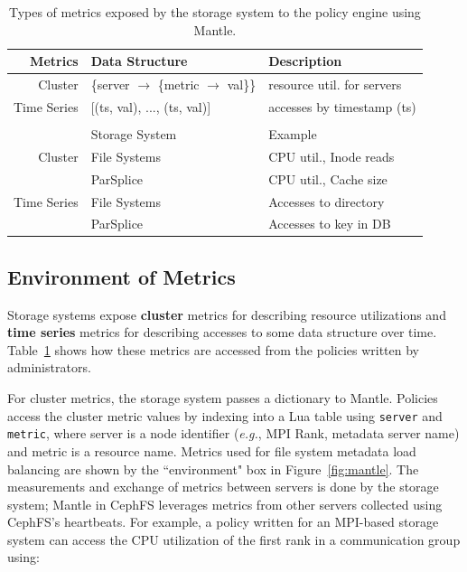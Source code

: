 \begin{table}
  \centering
  \ssp
  \begin{tabular}{ r | l | l }
  Metrics     & Data Structure & Description \\\hline
  Cluster     & \{server \(\rightarrow\) \{metric \(\rightarrow\) val\}\}
              & resource util. for servers \\
  Time Series & [(ts, val), ..., (ts, val)]
              & accesses by timestamp (ts) \\
  && \\
              & Storage System & Example \\\hline
  Cluster     & File Systems & CPU util., Inode reads \\
              & ParSplice    & CPU util., Cache size \\
  Time Series & File Systems & Accesses to directory \\
              & ParSplice    & Accesses to key in DB\\
  \end{tabular}
  \dsp
  \caption{Types of metrics exposed by the storage system to the policy engine using Mantle.\label{table:metrics}}
\end{table}

\subsection{Environment of Metrics} Storage systems expose \textbf{cluster} metrics
for describing resource utilizations and \textbf{time series} metrics for
describing accesses to some data structure over time. Table~\ref{table:metrics}
shows how these metrics are accessed from the policies written by
administrators. 

For cluster metrics, the storage system passes a dictionary to Mantle. Policies access
the cluster metric values by indexing into a Lua table using \texttt{server}
and \texttt{metric}, where server is a node identifier ({\it e.g.}, MPI Rank,
metadata server name) and metric is a resource name.  Metrics used for file
system metadata load balancing are shown by the ``environment" box in
Figure~\ref{fig:mantle}. The measurements and exchange of metrics between
servers is done by the storage system; Mantle in CephFS leverages metrics from other
servers collected using CephFS's heartbeats.  For example, a policy written for
an MPI-based storage system can access the CPU utilization of the first rank in a
communication group using:\\

